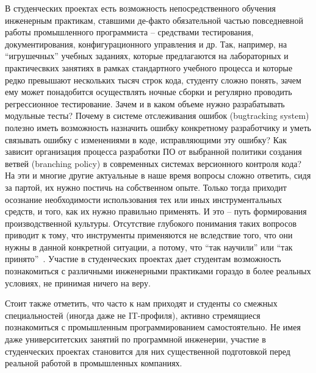 \documentclass[a5paper]{article}
\begin{document}
В студенческих проектах есть возможность непосредственного обучения инженерным практикам, ставшими де-факто обязательной частью повседневной работы промышленного программиста -- средствами тестирования, документирования, конфигурационного управления и др. Так, например, на ``игрушечных'' учебных заданиях, которые предлагаются на лабораторных и практичесвких занятиях в рамках стандартного учебного процесса и которые редко превышают нескольких тысяч строк кода, студенту сложно понять, зачем ему может понадобится осуществлять ночные сборки и регулярно проводить регрессионное тестирование. Зачем и в каком объеме нужно разрабатывать модульные тесты? Почему в системе отслеживания ошибок (bugtracking system) полезно иметь возможность назначить ошибку конкретному разработчику и уметь связывать ошибку с изменениями в коде, исправляющими эту ошибку? Как зависит организация процесса разработки ПО от выбранной политики создания ветвей (branching policy) в современных системах версионного контроля кода? На эти и многие другие актуальные в наше время вопросы сложно ответить, сидя за партой, их нужно постичь на собственном опыте. Только тогда приходит осознание необходимости использования тех или иных инструментальных средств, и того, как их нужно правильно применять. И это -- путь формирования производственной культуры. Отсутствие глубокого понимания таких вопросов приводит к тому, что инструменты применяются не вследствие того, что они нужны в данной конкретной ситуации, а потому, что ``так научили'' или ``так принято''~\cite{cargoCult}. Участие в студенческих проектах дает студентам возможность познакомиться с различными инженерными практиками гораздо в более реальных условиях, не принимая ничего на веру. 

Стоит также отметить, что часто к нам приходят и студенты со смежных специальностей (иногда даже не IT-профиля), активно стремящиеся познакомиться с промышленным программированием самостоятельно. Не имея даже университетских занятий по программной инженерии, участие в студенческих проектах становится для них существенной подготовкой перед реальной работой в промышленных компаниях.
\end{document}

